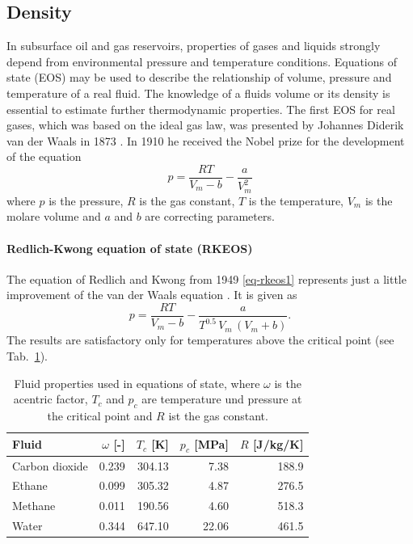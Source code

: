 \subsection{Density} 
\label{eos-density}

In subsurface oil and gas reservoirs, properties of gases and liquids strongly depend from environmental pressure and temperature conditions. Equations of state (EOS) may be used to describe the relationship of volume, pressure and temperature of a real fluid. The knowledge of a fluids volume or its density is essential to estimate further thermodynamic properties. The first EOS for real gases, which was based on the ideal gas law, was presented by Johannes Diderik {van der Waals} in 1873 \cite{VanWaa:73}. In 1910 he received the Nobel prize for the development of the equation
%
\begin{equation}
p=\frac{RT}{V_m-b}-\frac{a}{V^2_m}
\label{eq-van-der-waals}
\end{equation}
%
where $p$ is the pressure, $R$ is the gas constant, $T$ is the temperature, $V_m$ is the molare volume and $a$ and $b$ are correcting parameters. 

\paragraph{Redlich-Kwong equation of state (RKEOS)}

The equation of {Redlich} and {Kwong} from 1949 \eqref{eq-rkeos1} represents just a little improvement of the van der Waals equation \cite{RedKwo:49}. It is given as
%
\begin{equation}
p=\frac{RT}{V_m-b}-\frac{a}{T^{0.5}\,V_m\,(V_m+b)}.
\label{eq-rkeos1}
\end{equation}
%
The results are satisfactory only for temperatures above the critical point (see Tab.~\ref{tab-eos2}). 

\begin{table}[H]
  \caption{\label{tab-eos2}Fluid properties used in equations of state, where $\omega$ is the acentric factor, $T_c$ and $p_c$ are temperature und pressure at the critical point and $R$ ist the gas constant.}
  \begin{center}
\begin{tabular}{lrrrr}
\toprule
  Fluid 		& $\omega$ [-]  & $T_c$ [K] & $p_c$ [MPa] & $R$ [J/kg/K]\\
\midrule
  Carbon dioxide & 0.239  			& 304.13 & 7.38 		& 188.9\\
  Ethane         & 0.099  			& 305.32	& 4.87 		& 276.5\\
  Methane        & 0.011  			& 190.56 & 4.60 		& 518.3\\
  Water          & 0.344  			& 647.10 & 22.06 		& 461.5\\
\bottomrule
\end{tabular}
\end{center}
\end{table}

